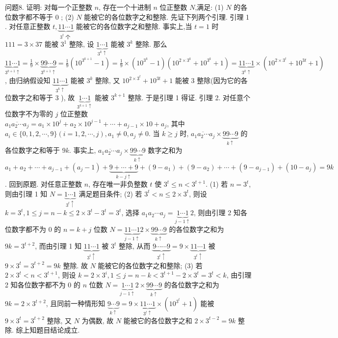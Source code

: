 问题8. 证明: 对每一个正整数 $n$, 存在一个十进制 $n$ 位正整数 $N$,满足:
(1) $N$ 的各位数字都不等于 0 ;
(2) $N$ 能被它的各位数字之和整除.
先证下列两个引理.
引理 1 . 对任意正整数 $t, \underbrace{11 \cdots 1}_{3^t \text { 个 }}$ 能被它的各位数字之和整除.
事实上,当 $t=1$ 时 $111=3 \times 37$ 能被 $3^1$ 整除, 设 $\underbrace{1 \cdots 1}_{3^k \uparrow}$ 能被 $3^k$ 整除.
那么 $\underbrace{11 \cdots 1}_{3^{k+1} \uparrow}=\frac{1}{9} \times \underbrace{99 \cdots 9}_{3^{k+1} \uparrow}=\frac{1}{9}\left(10^{3^{k+1}}-1\right)=\frac{1}{9} \times\left(10^{3^k}-1\right)\left(10^{2 \times 3^k}+10^{3^k}+1\right)= \underbrace{11 \cdots 1}_{3^k \uparrow} \times\left(10^{2 \times 3^t}+10^{3 t}+1\right)$, 由归纳假设知 $\underbrace{11 \cdots 1}_{3^k \uparrow}$ 能被 $3^k$ 整除, 又 $10^{2 \times 3^t}+10^{3 t}+1$ 能被 3 整除(因为它的各位数字之和等于 3 ), 故 $\underbrace{1 \cdots 1}_{3^{k+1} \uparrow}$ 能被 $3^{k+1}$ 整除.
于是引理 1 得证.
引理 2. 对任意个位数字不为零的 $j$ 位正整数 $\overline{a_1 a_2 \cdots a_j}=a_1 \times 10^j+a_2 \times 10^{j-1}+ \cdots+a_{j-1} \times 10+a_j$, 其中 $a_i \in\{0,1,2, \cdots, 9\}(i=1,2, \cdots, j), a_1 \neq 0, a_j \neq 0$. 当 $k \geqslant j$ 时, $\overline{a_1 a_2 \cdots a_j} \times \underbrace{99 \cdots 9}_{k \uparrow}$ 的各位数字之和等于 $9 k$. 事实上, $\overline{a_1 a_2 \cdots a_j} \times \underbrace{99 \cdots 9}_{k \uparrow}$ 数字之和为 $a_1+a_2+\cdots+a_{j-1}+\left(a_j-1\right)+\underbrace{9+\cdots+9}_{k-j \uparrow}+\left(9-a_1\right)+\left(9-a_2\right) +\cdots+\left(9-a_{j-1}\right)+\left(10-a_j\right)=9 k$. 回到原题.
对任意正整数 $n$, 存在唯一非负整数 $t$ 使 $3^t \leqslant n<3^{t+1}$. (1) 若 $n=3^t$, 则由引理 1 知 $N=\underbrace{1 \cdots 1}_{3^t \uparrow}$ 满足题目条件; (2) 若 $3^t<n \leqslant 2 \times 3^t$, 则设 $k=3^t, 1 \leqslant j=n-k \leqslant 2 \times 3^t-3^t=3^t$, 选择 $a_1 a_2 \cdots a_j=\underbrace{1 \cdots 1}_{j-1 \uparrow} 2$, 则由引理 2 知各位数字都不为 0 的 $n=k+j$ 位数 $N= \underbrace{11 \cdots 1}_{j-1 \uparrow} 2 \times \underbrace{99 \cdots 9}_{k \uparrow}$ 的各位数字之和为 $9 k=3^{t+2}$, 而由引理 1 知 $\underbrace{11 \cdots 1}_{3^t \uparrow}$ 被 $3^t$ 整除, 从而 $\underbrace{9 \cdots \cdots 9}_{3^t \uparrow}=9 \times \underbrace{11 \cdots 1}_{3^t \uparrow}$ 被 $9 \times 3^t=3^{t+2}=9 k$ 整除.
故 $N$ 能被它的各位数字之和整除; (3) 若 $2 \times 3^t<n<3^{t+1}$, 则设 $k=2 \times 3^i, 1 \leqslant j=n-k< 3^{t+1}-2 \times 3^t=3^t<k$, 由引理 2 知各位数字都不为 0 的 $n$ 位数 $N=\underbrace{1 \cdots 1}_{j-1 \uparrow} 2 \times \underbrace{99 \cdots 9}_{k \uparrow}$ 的各位数字之和为 $9 k=2 \times 3^{t+2}$, 且同前一种情形知 $\underbrace{9 \cdots 9}_{k \uparrow}=9 \times \underbrace{11 \cdots 1}_{3^l \uparrow} \times\left(10^{3^t}+1\right)$ 能被 $9 \times 3^t=3^{t+2}$ 整除, 又 $N$ 为偶数, 故 $N$ 能被它的各位数字之和 $2 \times 3^{t-2}=9 k$ 整除.
综上知题目结论成立.


